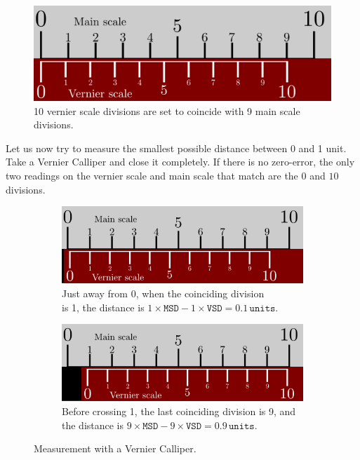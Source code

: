 \begin{figure}[!htb]
    \centering
    \includegraphics[scale=0.75]{figs/vernier1.png}
    \caption{10 vernier scale divisions are set to coincide with 9 main scale divisions.}
    \label{fig:vernier_1}
\end{figure}

Let us now try to measure the smallest possible distance between 0 and 1 unit. Take a Vernier Calliper and close it completely. If there is no zero-error, the only two readings on the vernier scale and main scale that match are the $0$ and $10$ divisions.

\begin{figure}[!htb]
        \begin{subfigure}[b]{0.5\textwidth}
                \includegraphics[width=0.95\linewidth]{figs/vernier2.png}
                \caption{Just away from 0, when the coinciding division \\is 1, the distance is $1\times\texttt{MSD}-1\times\texttt{VSD}=0.1\, \texttt{units}$.}
                \label{fig:vernier_2}
        \end{subfigure}\hfill
        \begin{subfigure}[b]{0.5\textwidth}
                \includegraphics[width=0.95\linewidth]{figs/vernier3.png}
                \caption{Before crossing 1, the last coinciding division is 9, and the distance is $9\times\texttt{MSD}-9\times\texttt{VSD}=0.9\, \texttt{units}$.}
                \label{fig:vernier_3}
        \end{subfigure}%
        \caption{Measurement with a Vernier Calliper.}
        \label{fig:verniermeasurements}
\end{figure}

